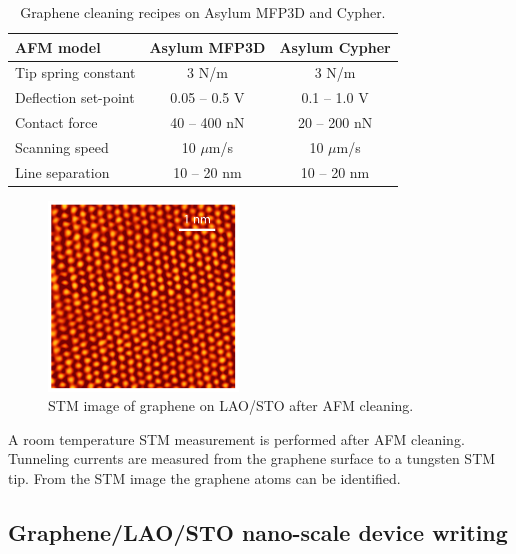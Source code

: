 \documentclass[pdflatex, sectionletters, 12pt, final, phd]{pittetd}    %
\begin{document}
\begin{table}[h!]
	\centering
	\vspace{0.85cm}
	\begin{tabular}{l|cc}
		\hline
		AFM model    &    Asylum MFP3D    &    Asylum Cypher \\ \hline
		Tip spring constant    &    3 N/m    & 3 N/m    \\ 
		Deflection set-point    &    0.05 -- 0.5 V    &    0.1 -- 1.0 V    \\        
		Contact force    &    40 -- 400 nN    &    20 -- 200 nN    \\
		Scanning speed    &    10 $\mu$m/s    &    10 $\mu$m/s \\ 
		Line separation    &    10 -- 20 nm    &    10 -- 20 nm    \\ \hline
	\end{tabular}
	\caption{Graphene cleaning recipes on Asylum MFP3D and Cypher.}
	\label{TAB:AFMCleaning}
	
\end{table}

\begin{figure}[h!]
	\centering
	\vspace{0.85cm}
	\includegraphics[width=0.45\textwidth]{Drawing/GrapheneSTM.pdf}
	\caption[STM image of graphene on LAO/STO after AFM cleaning]{STM image of graphene on LAO/STO after AFM cleaning.}
	\label{FIG:GrapheneSTM}
\end{figure}

A room temperature STM measurement is performed after AFM cleaning. Tunneling currents are measured from the graphene surface to a tungsten STM tip. From the STM image the graphene atoms can be identified.

\subsection{Graphene/LAO/STO nano-scale device writing}
\end{document}
